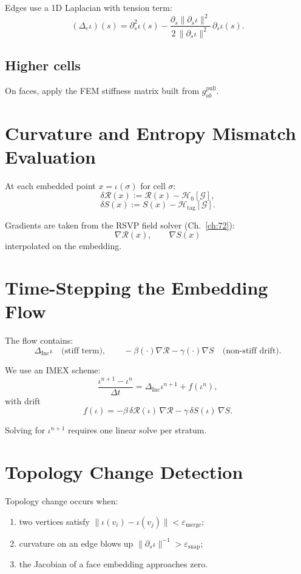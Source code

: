 Edges use a 1D Laplacian with tension term:
\[
 (\Delta_e \iota)(s)
   = \partial_s^2 \iota(s) 
     - \frac{\partial_s \|\partial_s \iota\|^2}
            {2\,\|\partial_s \iota\|^2}\,\partial_s \iota(s).
\]

\subsection{Higher cells}

On faces, apply the FEM stiffness matrix built from
$g_{ab}^{\text{pull}}$.

\section{Curvature and Entropy Mismatch Evaluation}

At each embedded point $x = \iota(\sigma)$ for cell $\sigma$:
\[
 \delta\mathcal{R}(x) := \mathcal{R}(x) - \mathcal{H}_0[\mathcal{G}],
\]
\[
 \delta S(x) := S(x) - \mathcal{H}_{\mathrm{tag}}[\mathcal{G}].
\]

Gradients are taken from the RSVP field solver (Ch.~\ref{ch:72}):
\[
 \nabla\mathcal{R}(x)
 ,\qquad 
 \nabla S(x)
\]
interpolated on the embedding.

\section{Time-Stepping the Embedding Flow}

The flow contains:
\[
 \Delta_{\mathrm{Inc}}\iota 
  \quad\text{(stiff term)},\qquad
  - \beta(\cdot)\nabla\mathcal{R}
  - \gamma(\cdot)\nabla S
 \quad\text{(non-stiff drift)}.
\]

We use an IMEX scheme:
\[
 \frac{\iota^{n+1} - \iota^n}{\Delta t}
   = \Delta_{\mathrm{Inc}} \iota^{n+1}
     + f(\iota^n),
\]
with drift
\[
 f(\iota)
   = -\beta\,\delta\mathcal{R}(\iota)\,\nabla\mathcal{R}
     -\gamma\,\delta S(\iota)\,\nabla S.
\]

Solving for $\iota^{n+1}$ requires one linear solve per stratum.

\section{Topology Change Detection}

Topology change occurs when:
\begin{enumerate}
\item two vertices satisfy 
      $\|\iota(v_i)-\iota(v_j)\| < \varepsilon_{\text{merge}}$;
\item curvature on an edge blows up  
      $\|\partial_s\iota\|^{-1} > \varepsilon_{\text{snap}}$;
\item the Jacobian of a face embedding approaches zero.
\end{enumerate}

